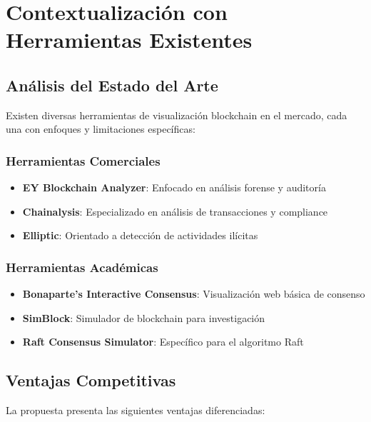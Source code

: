 \documentclass[spanish,12pt,letterpaper]{report}
\begin{document}
\section{Contextualización con Herramientas Existentes}

\subsection{Análisis del Estado del Arte}

Existen diversas herramientas de visualización blockchain en el mercado, cada una con enfoques y limitaciones específicas:

\subsubsection{Herramientas Comerciales}

\begin{itemize}
    \item \textbf{EY Blockchain Analyzer}: Enfocado en análisis forense y auditoría \cite{ey_blockchain_analyzer}
    \item \textbf{Chainalysis}: Especializado en análisis de transacciones y compliance
    \item \textbf{Elliptic}: Orientado a detección de actividades ilícitas
\end{itemize}

\subsubsection{Herramientas Académicas}

\begin{itemize}
    \item \textbf{Bonaparte's Interactive Consensus}: Visualización web básica de consenso \cite{bonaparte_interactive_consensus}
    \item \textbf{SimBlock}: Simulador de blockchain para investigación
    \item \textbf{Raft Consensus Simulator}: Específico para el algoritmo Raft \cite{raft_consensus_simulator}
\end{itemize}

\subsection{Ventajas Competitivas}

La propuesta presenta las siguientes ventajas diferenciadas:
\end{document}
